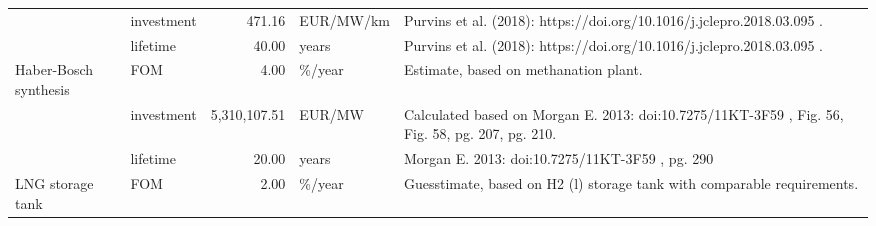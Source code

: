 \begin{longtable}{p{5cm}p{3cm}rp{3cm}p{11cm}}
                      & investment &         471.16 &                         EUR/MW/km &                                                                                                                                                                                                                                                               Purvins et al. (2018): https://doi.org/10.1016/j.jclepro.2018.03.095 . \\
                      & lifetime &          40.00 &                             years &                                                                                                                                                                                                                                                               Purvins et al. (2018): https://doi.org/10.1016/j.jclepro.2018.03.095 . \\
Haber-Bosch synthesis & FOM &           4.00 &                            \%/year &                                                                                                                                                                                                                                                                                                Estimate, based on methanation plant. \\
                      & investment &   5,310,107.51 &                            EUR/MW &                                                                                                                                                                                                                                      Calculated based on Morgan E. 2013: doi:10.7275/11KT-3F59 , Fig. 56, Fig. 58, pg. 207, pg. 210. \\
                      & lifetime &          20.00 &                             years &                                                                                                                                                                                                                                                                                      Morgan E. 2013: doi:10.7275/11KT-3F59 , pg. 290 \\
LNG storage tank & FOM &           2.00 &                            \%/year &                                                                                                                                                                                                                                                              Guesstimate, based on H2 (l) storage tank with comparable requirements. \\

\end{longtable}
